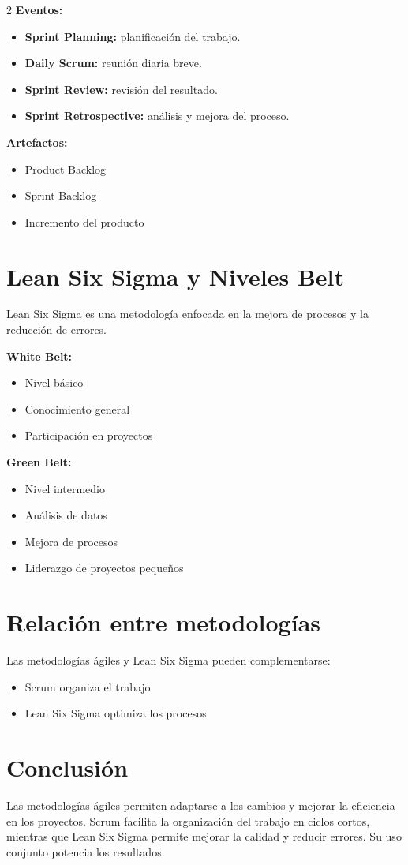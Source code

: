\documentclass[11pt]{article}
\begin{document}
\begin{multicols}{2}
\textbf{Eventos:}
\begin{itemize}
    \item \textbf{Sprint Planning:} planificación del trabajo.
    \item \textbf{Daily Scrum:} reunión diaria breve.
    \item \textbf{Sprint Review:} revisión del resultado.
    \item \textbf{Sprint Retrospective:} análisis y mejora del proceso.
\end{itemize}

\textbf{Artefactos:}
\begin{itemize}
    \item Product Backlog
    \item Sprint Backlog
    \item Incremento del producto
\end{itemize}

\section*{Lean Six Sigma y Niveles Belt}
Lean Six Sigma es una metodología enfocada en la mejora de procesos y la reducción de errores.

\textbf{White Belt:}
\begin{itemize}
    \item Nivel básico
    \item Conocimiento general
    \item Participación en proyectos
\end{itemize}

\textbf{Green Belt:}
\begin{itemize}
    \item Nivel intermedio
    \item Análisis de datos
    \item Mejora de procesos
    \item Liderazgo de proyectos pequeños
\end{itemize}

\section*{Relación entre metodologías}
Las metodologías ágiles y Lean Six Sigma pueden complementarse:
\begin{itemize}
    \item Scrum organiza el trabajo
    \item Lean Six Sigma optimiza los procesos
\end{itemize}

\section*{Conclusión}
Las metodologías ágiles permiten adaptarse a los cambios y mejorar la eficiencia en los proyectos. 
Scrum facilita la organización del trabajo en ciclos cortos, mientras que Lean Six Sigma permite 
mejorar la calidad y reducir errores. Su uso conjunto potencia los resultados.

\end{multicols}
\end{document}

